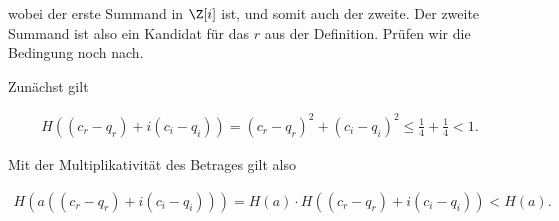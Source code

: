 \begin{solution}
wobei der erste Summand in $\Z [i]$ ist, und somit auch der zweite. Der zweite Summand ist also ein Kandidat für das $r$ aus der Definition. Prüfen wir die Bedingung noch nach.

Zunächst gilt

\begin{align*}
  H((c_r- q_r) + i (c_i - q_i)) = (c_r- q_r)^2 + (c_i - q_i)^2 \leq \frac{1}{4} + \frac{1}{4} < 1.
\end{align*}

Mit der Multiplikativität des Betrages gilt also

\begin{align*}
  H(a((c_r- q_r) + i (c_i - q_i))) = H(a) \cdot H((c_r- q_r) + i (c_i - q_i)) < H(a).
\end{align*}


\end{solution}

